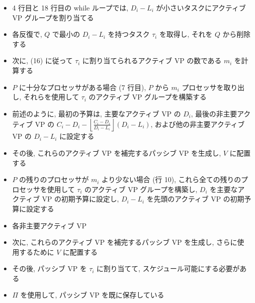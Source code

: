 \begin{frame}{}
    \begin{itemize}
        \item 4 行目と 18 行目の while ループでは, $D_{i}-L_{i}$ が小さいタスクにアクティブ VP グループを割り当てる
\item 各反復で, $Q$ で最小の $D_{i}-L_{i}$ を持つタスク $\tau_{i}$ を取得し, それを $Q$ から削除する
\item 次に, (16) に従って $\tau_{i}$ に割り当てられるアクティブ VP の数である $m_{i}$ を計算する
    \end{itemize}
\end{frame}

\begin{frame}{}
    \begin{itemize}
        \item $P$ に十分なプロセッサがある場合 (7 行目), $P$ から $m_{i}$ プロセッサを取り出し, それらを使用して $\tau_{i}$ のアクティブ VP グループを構築する
\item 前述のように, 最初の予算は, 主要なアクティブ VP の $D_{i}$, 最後の非主要アクティブ VP の $C_{i}-D_{i}-\left\lfloor\frac{C_{i}-D_{i}}{D_{i}-L_{i}}\right\rfloor\left(D_{i}-L_{i}\right)$, および他の非主要アクティブ VP の $D_{i}-L_{i}$ に設定する
\item その後, これらのアクティブ VP を補完するパッシブ VP を生成し, $V$ に配置する
    \end{itemize}
\end{frame}

\begin{frame}{}
    \begin{itemize}
        \item $P$ の残りのプロセッサが $m_{i}$ より少ない場合 (行 10), これら全ての残りのプロセッサを使用して $\tau_{i}$ のアクティブ VP グループを構築し, $D_{i}$ を主要なアクティブ VP の初期予算に設定し, $D_{i}-L_{i}$ を先頭のアクティブ VP の初期予算に設定する
\item 各非主要アクティブ VP
\item 次に, これらのアクティブ VP を補完するパッシブ VP を生成し, さらに使用するために $V$ に配置する
\item その後, パッシブ VP を $\tau_{i}$ に割り当てて, スケジュール可能にする必要がある
\item $\Pi$ を使用して, パッシブ VP を既に保存している
    \end{itemize}
\end{frame}

